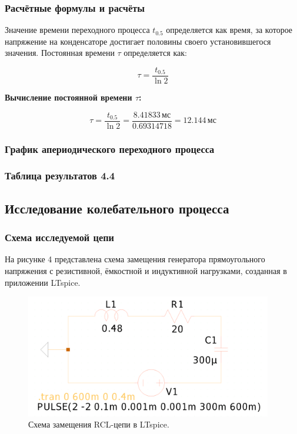 \subsubsection{Расчётные формулы и расчёты}

Значение времени переходного процесса \( t_{0.5} \) определяется как время, за которое напряжение на конденсаторе достигает половины своего установившегося значения. Постоянная времени \( \tau \) определяется как:

\[
	\tau = \frac{t_{0.5}}{\ln 2}
\]

\textbf{Вычисление постоянной времени \( \tau \):}

\[
	\tau = \frac{t_{0.5}}{\ln 2} = \frac{8.41833 \, \text{мс}}{0.69314718} = 12.144 \, \text{мс}
\]

\subsubsection{График апериодического переходного процесса}


\subsubsection{Таблица результатов 4.4}




\subsection{Исследование колебательного процесса}

\subsubsection{Схема исследуемой цепи}
На рисунке 4 представлена схема замещения генератора прямоугольного напряжения с резистивной, ёмкостной и индуктивной нагрузками, созданная в приложении LTspice.

\begin{figure}[H]
	\centering
	\includegraphics[width=0.96\textwidth]{./data/rcl_2-schema.png}
	\caption{Схема замещения RCL-цепи в LTspice.}
\end{figure}

